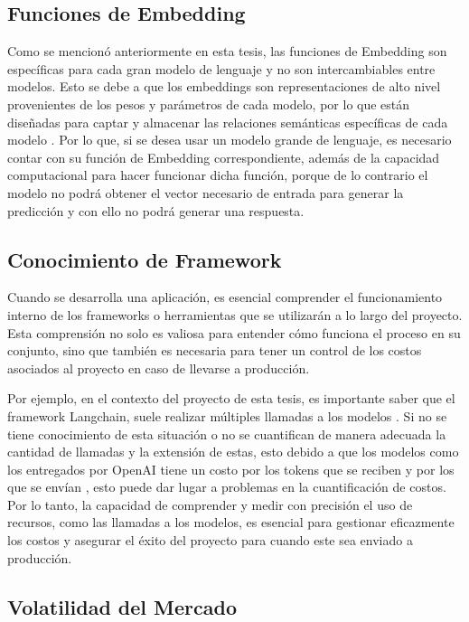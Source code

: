 \subsection{Funciones de Embedding}

Como se mencionó anteriormente en esta tesis, las funciones de Embedding son específicas para cada gran modelo de lenguaje y no son intercambiables entre modelos. Esto se debe a que los embeddings son 
representaciones de alto nivel provenientes de los pesos y parámetros de cada modelo, por lo que están diseñadas para captar y almacenar las relaciones semánticas específicas de cada modelo \cite{microsoft1}. Por lo que, si se desea usar un modelo grande de lenguaje, es necesario contar con su función de Embedding correspondiente, además de la capacidad computacional para hacer funcionar dicha función, porque de lo contrario el modelo no podrá obtener el vector necesario de entrada para generar la predicción y con ello no podrá generar una respuesta. 


\subsection{Conocimiento de Framework}
Cuando se desarrolla una aplicación, es esencial comprender el funcionamiento interno de los frameworks o herramientas que se utilizarán a lo largo del proyecto. 
Esta comprensión no solo es valiosa para entender cómo funciona el proceso en su conjunto, sino que también es necesaria para tener un control de los costos asociados al 
proyecto en caso de llevarse a producción.  

Por ejemplo, en el contexto del proyecto de esta tesis, es importante saber que el framework Langchain, suele realizar múltiples llamadas a los modelos \cite{framework1}. Si no se tiene conocimiento de esta situación o no se cuantifican de manera adecuada 
la cantidad de llamadas y la extensión de estas, esto debido a que los modelos como los entregados por OpenAI tiene un costo por los tokens que se reciben y por los que se envían \cite{openaimodels}, esto puede dar lugar a problemas en la cuantificación de costos. Por lo tanto, la capacidad de comprender y 
medir con precisión el uso de recursos, como las llamadas a los modelos, es esencial para gestionar eficazmente los costos y asegurar el éxito del proyecto para cuando este sea enviado a producción.


\subsection{Volatilidad del Mercado}

